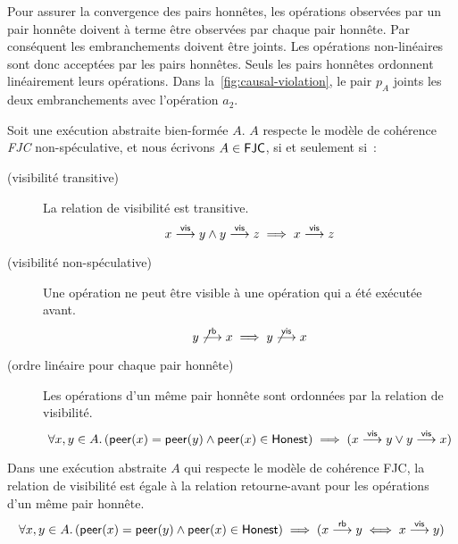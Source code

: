 Pour assurer la convergence des pairs honnêtes, les opérations observées par un pair honnête doivent à terme être observées par chaque pair honnête.
Par conséquent les embranchements doivent être joints.
Les opérations non-linéaires sont donc acceptées par les pairs honnêtes.
Seuls les pairs honnêtes ordonnent linéairement leurs opérations.
Dans la~\autoref{fig:causal-violation}, le pair $p_A$ joints les deux embranchements avec l'opération $a_2$.

\begin{definition}\label{def:fjc-consistency}
  Soit une exécution abstraite bien-formée $A$. $A$ respecte le modèle de cohérence \emph{\acf{FJC}} non-spéculative, et nous écrivons $A \in \operatorname{\mathsf{FJC}}$, si et seulement si~:

  \begin{description}
  \item[ (visibilité transitive)]
  La relation de visibilité est transitive.
  \begin{equation*}
    x \overset{\mathsf{vis}}{\longrightarrow} y \land y \overset{\mathsf{vis}}{\longrightarrow} z \implies x \overset{\mathsf{vis}}{\longrightarrow} z
  \end{equation*}

  \item[ (visibilité non-spéculative)]
  Une opération ne peut être visible à une opération qui a été exécutée avant.
  \begin{equation*}
    y \not\overset{\mathsf{rb}}{\longrightarrow} x \implies y \not\overset{\mathsf{vis}}{\longrightarrow} x
  \end{equation*}

  \item[ (ordre linéaire pour chaque pair honnête)]
  Les opérations d'un même pair honnête sont ordonnées par la relation de visibilité.
  \begin{equation*}
    \forall x, y \in A \ldotp (\operatorname{\mathsf{peer}}(x) = \operatorname{\mathsf{peer}}(y) \land \operatorname{\mathsf{peer}}(x) \in \operatorname{\mathsf{Honest}}) \implies (x \overset{\mathsf{vis}}{\longrightarrow} y \lor y \overset{\mathsf{vis}}{\longrightarrow} x)
  \end{equation*}
  \end{description}
\end{definition}

\begin{proposition}\label{th:honest-rb-vis}
Dans une exécution abstraite $A$ qui respecte le modèle de cohérence \ac{FJC}, la relation de visibilité est égale à la relation retourne-avant pour les opérations d'un même pair honnête.
\begin{equation*}
    \forall x, y \in A \ldotp (\operatorname{\mathsf{peer}}(x) = \operatorname{\mathsf{peer}}(y) \land \operatorname{\mathsf{peer}}(x) \in \operatorname{\mathsf{Honest}}) \implies (x \overset{\mathsf{rb}}{\longrightarrow} y \iff x \overset{\mathsf{vis}}{\longrightarrow} y)
\end{equation*}
\end{proposition}

